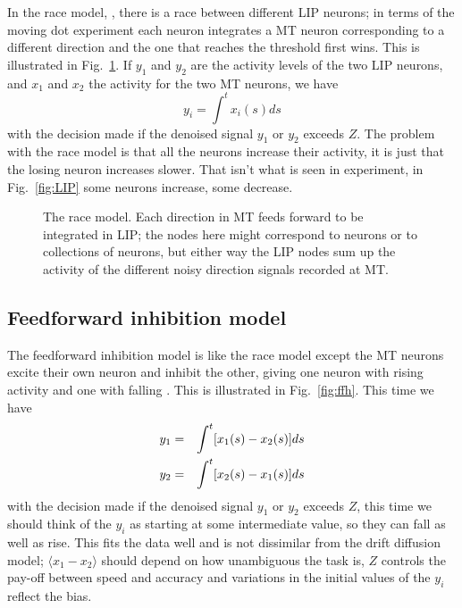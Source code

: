 \documentclass[11pt,a4paper]{scrartcl}
\begin{document}
In the race model, \cite{Vickers1970a}, there is a race between
different LIP neurons; in terms of the moving dot experiment each
neuron integrates a MT neuron corresponding to a different direction
and the one that reaches the threshold first wins. This is illustrated
in Fig.~\ref{fig:race}. If $y_1$ and $y_2$ are the activity levels of
the two LIP neurons, and $x_1$ and $x_2$ the activity for the two MT neurons, we have
\begin{equation}
y_i=\int^t x_i(s)ds
\end{equation}
with the decision made if the denoised signal $y_1$ or $y_2$ exceeds $Z$. The problem with
the race model is that all the neurons increase their activity, it is
just that the losing neuron increases slower. That isn't what is seen
in experiment, in Fig.~\ref{fig:LIP} some neurons increase, some
decrease.

\begin{figure}
\begin{center}
\end{center}
\caption{The race model. Each direction in MT feeds forward to be
  integrated in LIP; the nodes here might correspond to neurons or to
  collections of neurons, but either way the LIP nodes sum up the
  activity of the different noisy direction signals recorded at MT.\label{fig:race}}
\end{figure}

\subsection*{Feedforward inhibition model}

The feedforward inhibition model is like the race model except the MT
neurons excite their own neuron and inhibit the other, giving one
neuron with rising activity and one with falling \cite{ShadlenNewsome2001a}. This is illustrated
in Fig.~\ref{fig:ffh}. This time we have
\begin{eqnarray}
y_1&=&\int^t [x_1(s)-x_2(s)]ds\cr
y_2&=&\int^t [x_2(s)-x_1(s)]ds
\end{eqnarray}
with the decision made if the denoised signal $y_1$ or $y_2$ exceeds
$Z$, this time we should think of the $y_i$ as starting at some
intermediate value, so they can fall as well as rise. This fits the
data well and is not dissimilar from the drift diffusion model;
$\langle x_1-x_2\rangle$ should depend on how unambiguous the task is,
$Z$ controls the pay-off between speed and accuracy and variations in
the initial values of the $y_i$ reflect the bias.
\end{document}
